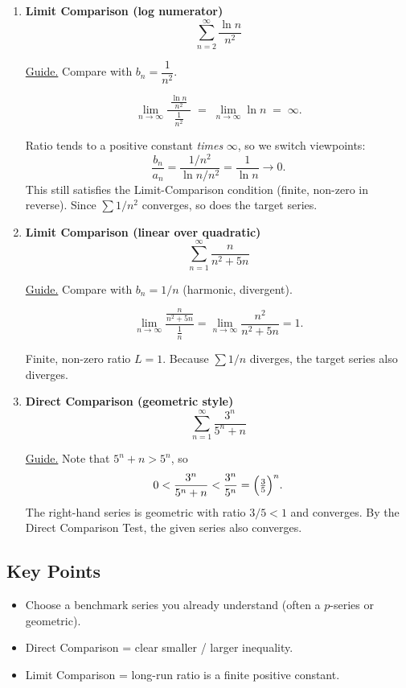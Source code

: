 \documentclass{article}
\begin{document}
\begin{enumerate}[label=\textbf{\arabic*.},itemsep=14pt]

\item \textbf{Limit Comparison (log numerator)}
      \[
      \sum_{n=2}^{\infty}\frac{\ln n}{n^{2}}
      \]

      \underline{Guide.}  Compare with \(b_n=\dfrac{1}{n^{2}}\).

      \[
      \lim_{n\to\infty}\frac{\;\tfrac{\ln n}{n^{2}}\;}{\;\tfrac{1}{n^{2}}\;}
      \;=\;
      \lim_{n\to\infty} \ln n
      \;=\;\infty.
      \]

      Ratio tends to a positive constant \emph{times} \(\infty\), so we switch viewpoints:
      \[
      \frac{b_n}{a_n} = \frac{1/n^{2}}{\ln n/n^{2}} = \frac{1}{\ln n}
      \longrightarrow 0.
      \]
      This still satisfies the Limit-Comparison condition (finite, non-zero in reverse).
      Since \(\sum 1/n^{2}\) converges, so does the target series.

\item \textbf{Limit Comparison (linear over quadratic)}
      \[
      \sum_{n=1}^{\infty} \frac{n}{n^{2}+5n}
      \]

      \underline{Guide.}  Compare with \(b_n=1/n\) (harmonic, divergent).

      \[
      \lim_{n\to\infty}\frac{\tfrac{n}{n^{2}+5n}}{\tfrac{1}{n}}
      =\lim_{n\to\infty}\frac{n^{2}}{n^{2}+5n}=1.
      \]

      Finite, non-zero ratio \(L=1\).
      Because \(\sum 1/n\) diverges, the target series also diverges.

\item \textbf{Direct Comparison (geometric style)}
      \[
      \sum_{n=1}^{\infty}\frac{3^{n}}{5^{n}+n}
      \]

      \underline{Guide.}  Note that \(5^{n}+n > 5^{n}\), so
      \[
      0 < \frac{3^{n}}{5^{n}+n} < \frac{3^{n}}{5^{n}}
      = \Bigl(\tfrac{3}{5}\Bigr)^{n}.
      \]
      The right-hand series is geometric with ratio \(3/5<1\) and converges.
      By the Direct Comparison Test, the given series also converges.

\end{enumerate}



\subsection*{Key Points}
\begin{itemize}[itemsep=4pt]
  \item Choose a benchmark series you already understand (often a \(p\)-series or geometric).
  \item Direct Comparison = clear smaller / larger inequality.
  \item Limit Comparison = long-run ratio is a finite positive constant.
\end{itemize}
\end{document}
